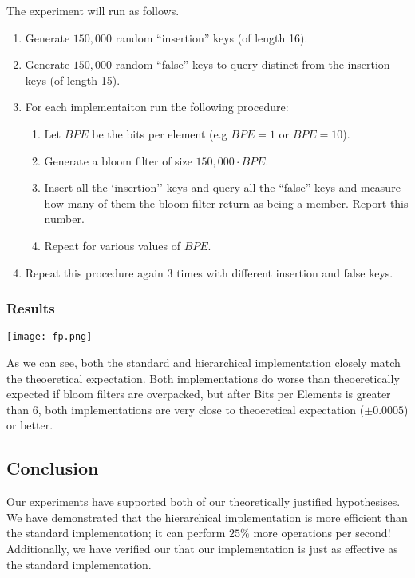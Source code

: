 The experiment will run as follows. 
\begin{enumerate}
\item Generate $150,000$ random ``insertion'' keys (of length 16).
\item Generate $150,000$ random ``false'' keys to query distinct from the insertion keys (of length 15).
\item For each implementaiton run the following procedure:
\begin{enumerate}
    \item Let $BPE$ be the bits per element (e.g $BPE = 1$ or $BPE = 10$).
    \item Generate a bloom filter of size $150,000\cdot BPE$.
    \item Insert all the `insertion'' keys and query all the ``false'' keys and measure how many of them the bloom filter return as being a member. Report this number.
    \item Repeat for various values of $BPE$.
\end{enumerate}
\item Repeat this procedure again $3$ times with different insertion and false keys.
\end{enumerate}

\subsubsection{Results}
\begin{center}
    \texttt{[image: fp.png]}
\end{center}

As we can see, both the standard and hierarchical implementation closely match the theoeretical expectation. 
Both implementations do worse than theoeretically expected if bloom filters are overpacked, but after Bits per Elements is greater than 6, both implementations are very close to theoeretical expectation ($\pm 0.0005$) or better.

\subsection{Conclusion}
Our experiments have supported both of our theoretically justified hypothesises.
We have demonstrated that the hierarchical implementation is more efficient than the standard implementation; it can perform $25\%$ more operations per second!
Additionally, we have verified our that our implementation is just as effective as the standard implementation. 
